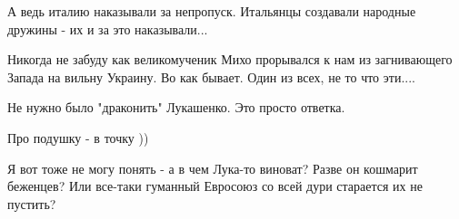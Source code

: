 \begin{itemize}
А ведь италию наказывали за непропуск. Итальянцы создавали народные дружины - их и за это наказывали...


Никогда не забуду как великомученик Михо прорывался к нам из загнивающего
Запада на вильну Украину. Во как бывает. Один из всех, не то что эти....

Не нужно было "драконить" Лукашенко. Это просто ответка.

Про подушку - в точку ))


Я вот тоже не могу понять - а в чем Лука-то виноват? Разве он кошмарит
беженцев? Или все-таки гуманный Евросоюз со всей дури старается их не пустить?

\end{itemize} %
